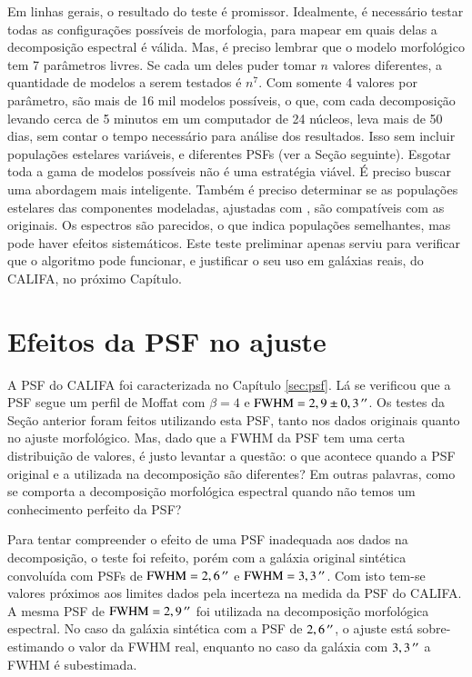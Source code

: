 
Em linhas gerais, o resultado do teste é promissor. Idealmente, é necessário
testar todas as configurações possíveis de morfologia, para mapear em quais
delas a decomposição espectral é válida. Mas, é preciso lembrar que o modelo
morfológico tem 7 parâmetros livres. Se cada um deles puder tomar $n$ valores
diferentes, a quantidade de modelos a serem testados é $n^7$. Com somente 4
valores por parâmetro, são mais de 16 mil modelos possíveis, o que, com cada
decomposição levando cerca de 5 minutos em um computador de 24 núcleos, leva
mais de 50 dias, sem contar o tempo necessário para análise dos resultados. Isso
sem incluir populações estelares variáveis, e diferentes PSFs (ver a Seção
seguinte). Esgotar toda a gama de modelos possíveis não é uma estratégia viável.
É preciso buscar uma abordagem mais inteligente. Também é preciso determinar se
as populações estelares das componentes modeladas, ajustadas com \starlight, são
compatíveis com as originais. Os espectros são parecidos, o que indica
populações semelhantes, mas pode haver efeitos sistemáticos. Este teste
preliminar apenas serviu para verificar que o algoritmo pode funcionar, e
justificar o seu uso em galáxias reais, do CALIFA, no próximo Capítulo.

\section{Efeitos da PSF no ajuste}
\label{sec:test:psf}

A PSF do CALIFA foi caracterizada no Capítulo \ref{sec:psf}. Lá se verificou que
a PSF segue um perfil de Moffat com $\beta=4$ e $\mathrm{FWHM} = 2,9 \pm
0,3\,^{\prime\prime}$. Os testes da Seção anterior foram feitos utilizando esta PSF, tanto
nos dados originais quanto no ajuste morfológico. Mas, dado que a FWHM da PSF
tem uma certa distribuição de valores, é justo levantar a questão: o que
acontece quando a PSF original e a utilizada na decomposição são diferentes? Em
outras palavras, como se comporta a decomposição morfológica espectral quando
não temos um conhecimento perfeito da PSF?

Para tentar compreender o efeito de uma PSF inadequada aos dados na
decomposição, o teste foi refeito, porém com a galáxia original sintética
convoluída com PSFs de $\mathrm{FWHM} = 2,6\,^{\prime\prime}$ e $\mathrm{FWHM} =
3,3\,^{\prime\prime}$. Com isto tem-se valores próximos aos limites dados pela incerteza
na medida da PSF do CALIFA. A mesma PSF de $\mathrm{FWHM} = 2,9\,^{\prime\prime}$ foi
utilizada na decomposição morfológica espectral. No caso da galáxia sintética
com a PSF de $2,6\,^{\prime\prime}$, o ajuste está sobre-estimando o valor da FWHM real,
enquanto no caso da galáxia com $3,3\,^{\prime\prime}$ a FWHM é subestimada.

